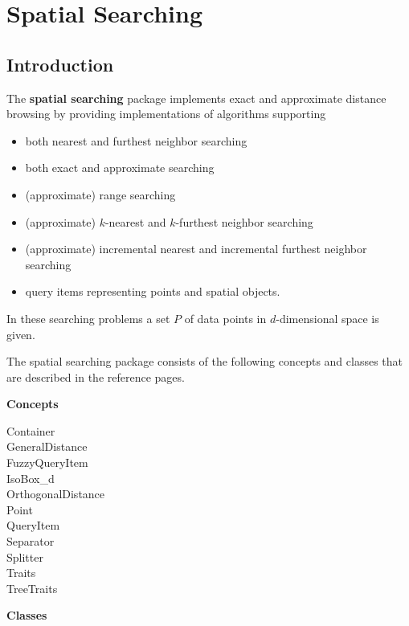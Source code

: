\chapter{Spatial Searching}

\section{Introduction}

The {\bf spatial searching} package implements
exact and approximate distance browsing
by providing implementations of algorithms supporting

\begin{itemize} 

\item
both nearest and furthest neighbor searching

\item
both exact and approximate searching

\item
(approximate) range searching

\item 
(approximate) $k$-nearest and $k$-furthest neighbor searching

\item 
(approximate) incremental nearest and incremental furthest neighbor searching

\item
query items representing points and spatial objects.

\end{itemize}

In these searching problems a set $P$ of data points in $d$-dimensional
space is given.

The spatial searching package 
consists of the following concepts and classes
that are described in the reference pages.

{\bf Concepts}

Container \\
GeneralDistance \\ 
FuzzyQueryItem \\
IsoBox\_d \\
OrthogonalDistance \\
Point \\
QueryItem \\
Separator \\
Splitter \\
Traits \\
TreeTraits

{\bf Classes}

